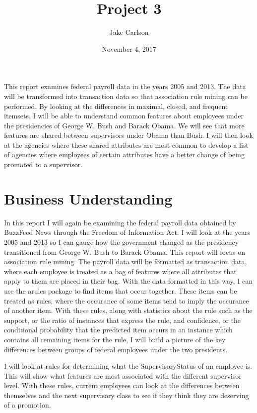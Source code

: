 \documentclass{article}
\begin{document}
\title{Project 3}
\author{Jake Carlson}
\date{November 4, 2017}
\maketitle

\abstract
This report examines federal payroll data in the years 2005 and 2013. The data will be transformed into transaction data so that association rule mining can be performed. By looking at the differences in maximal, closed, and frequent itemsets, I will be able to understand common features about employees under the presidencies of George W. Bush and Barack Obama. We will see that more features are shared between supervisors under Obama than Bush. I will then look at the agencies where these shared attributes are most common to develop a list of agencies where employees of certain attributes have a better change of being promoted to a supervisor.

\newpage

\tableofcontents
\newpage

\section{Business Understanding}
In this report I will again be examining the federal payroll data obtained by BuzzFeed News through the Freedom of Information Act. I will look at the years 2005 and 2013 so I can gauge how the government changed as the presidency transitioned from George W. Bush to Barack Obama. This report will focus on association rule mining. The payroll data will be formatted as transaction data, where each employee is treated as a bag of features where all attributes that apply to them are placed in their bag. With the data formatted in this way, I can use the arules package to find items that occur together. These items can be treated as rules, where the occurance of some items tend to imply the occurance of another item. With these rules, along with statistics about the rule such as the support, or the ratio of instances that express the rule, and confidence, or the conditional probability that the predicted item occurs in an instance which contains all remaining items for the rule, I will build a picture of the key differences between groups of federal employees under the two presidents.
\par
I will look at rules for determining what the SupervisoryStatus of an employee is. This will show what features are most associated with the different supervisor level. With these rules, current employees can look at the differences between themselves and the next supervisory class to see if they think they are deserving of a promotion.
\end{document}

